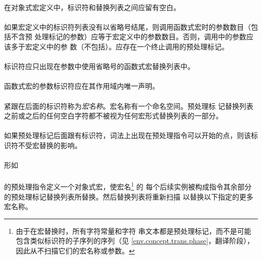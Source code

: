 {\paragraph{}
在对象式宏定义中，标识符和替换列表之间应留有空白。

\paragraph{}
如果宏定义中的标识符列表没有以省略号结尾，则调用函数式宏时的参数数目（包括不含预
处理标记的参数）应等于宏定义中的参数数目。否则，调用中的参数应该多于宏定义中的参
数（不包括）。应存在一个\tm{)}终止调用的预处理标记。

\paragraph{}
标识符应只出现在参数中使用省略号的函数式宏替换列表中。

\paragraph{}
函数式宏的参数标识符应在其作用域内唯一声明。

\semantic
\paragraph{}
紧跟在后面的标识符称为\textit{宏名称}。宏名称有一个命名空间。预处理标
记替换列表之前或之后的任何空白字符都不被视为任何宏形式替换列表的一部分。

\paragraph{}
如果预处理标记\tm{\#}后面跟有标识符，词法上出现在预处理指令可以开始的点，则该标
识符不受宏替换的影响。

\paragraph{}
形如                                                                          \\
\mbox{\hspace{4em} }   \\
的预处理指令定义一个对象式宏，使宏名\footnote{由于在宏替换时，所有字符常量和字符
串文本都是预处理标记，而不是可能包含类似标识符的子序列的序列（见
\ref{env.concept.trans.phase}，翻译阶段），因此从不扫描它们的宏名称或参数。} 的
每个后续实例被构成指令其余部分的预处理标记替换列表所替换。然后替换列表将重新扫描
以替换以下指定的更多宏名称。

}

